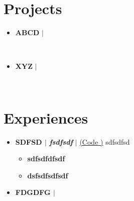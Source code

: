 \documentclass[letterpaper,5pt]{article}
\begin{document}
        
    
    \section{Projects}
    
        \begin{itemize}[leftmargin=0.15in,label={}]
        
          \item{
            \textbf{ABCD} $|$  
            \hfill 
          }
            \begin{itemize}
            \vspace{-5pt}
             
            \vspace{-5pt}
                 
            \   
            \end{itemize}
          
          \item{
            \textbf{XYZ} $|$  
            \hfill 
          }
            \begin{itemize}
            \vspace{-5pt}
             
            \vspace{-5pt}
                 
            \   
            \end{itemize}
          
          
      \end{itemize}
      \vspace*{-6mm}  
        


    
      
        \section{Experiences}
        \begin{itemize}[leftmargin=0.15in,label={}]
        
          \item[]
            \textbf{SDFSD $|$ \emph{fsdfsdf}} $|$ \href{sdfds}{({Code} \faExternalLink)} \hfill sdfsdfsd
            \begin{itemize}
              \vspace{-5pt}
              \item[\textbullet{}]\textbf{sdfsdfdfsdf} \ 
              \vspace{-5pt}
              \item[\textbullet{}]\textbf{dsfsdfsdfsdf} \              
            \end{itemize}
          \item[]
            \textbf{FDGDFG $|$ \emph{}}  \hfill 
            \begin{itemize}
              \vspace{-5pt}
              \
              \vspace{-5pt}
              \             
            \end{itemize}
      \end{itemize}
      
    
    
    
    
      
\end{document}
